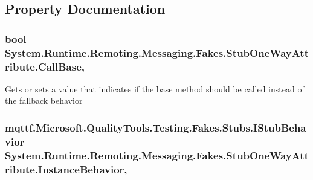\subsection{Property Documentation}
\hypertarget{class_system_1_1_runtime_1_1_remoting_1_1_messaging_1_1_fakes_1_1_stub_one_way_attribute_adad8931dd13bd9dab09193d3ccd7abb4}{
\subsubsection[{Call\-Base}]{\setlength{\rightskip}{0pt plus 5cm}bool System.\-Runtime.\-Remoting.\-Messaging.\-Fakes.\-Stub\-One\-Way\-Attribute.\-Call\-Base\hspace{0.3cm}{\ttfamily [get]}, {\ttfamily [set]}}}\label{class_system_1_1_runtime_1_1_remoting_1_1_messaging_1_1_fakes_1_1_stub_one_way_attribute_adad8931dd13bd9dab09193d3ccd7abb4}


Gets or sets a value that indicates if the base method should be called instead of the fallback behavior

\hypertarget{class_system_1_1_runtime_1_1_remoting_1_1_messaging_1_1_fakes_1_1_stub_one_way_attribute_a5bf7d3dec08d67984c2be40785ea3cfb}{
\subsubsection[{Instance\-Behavior}]{\setlength{\rightskip}{0pt plus 5cm}mqttf.\-Microsoft.\-Quality\-Tools.\-Testing.\-Fakes.\-Stubs.\-I\-Stub\-Behavior System.\-Runtime.\-Remoting.\-Messaging.\-Fakes.\-Stub\-One\-Way\-Attribute.\-Instance\-Behavior\hspace{0.3cm}{\ttfamily [get]}, {\ttfamily [set]}}}\label{class_system_1_1_runtime_1_1_remoting_1_1_messaging_1_1_fakes_1_1_stub_one_way_attribute_a5bf7d3dec08d67984c2be40785ea3cfb}


